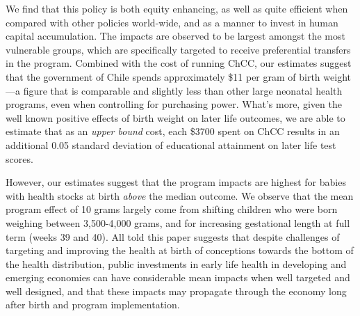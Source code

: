 \documentclass[12pt]{article}
\begin{document}
\begin{spacing}{1.4}
We find that this policy is both equity enhancing, as well as quite
efficient when compared with other policies world-wide, and as a manner
to invest in human capital accumulation.  The impacts are observed to
be largest amongst the most vulnerable groups, which are specifically
targeted to receive preferential transfers in the program. Combined with
the cost of running ChCC, our estimates suggest that the government of
Chile spends approximately \$11 per gram of birth weight---a figure that
is comparable and slightly less than other large neonatal health programs,
even when controlling for purchasing power.  What's more, given the well
known positive effects of birth weight on later life outcomes, we are able
to estimate that as an \emph{upper bound} cost, each \$3700 spent on ChCC
results in an additional 0.05 standard deviation of educational attainment
on later life test scores.

However, our estimates suggest that the program impacts are highest for
babies with health stocks at birth \emph{above} the median outcome.  We
observe that the mean program effect of 10 grams largely come from
shifting children who were born weighing between 3,500-4,000 grams, and
for increasing gestational length at full term (weeks 39 and 40). 
All told this paper suggests that despite challenges of targeting and
improving the health at birth of conceptions towards the bottom of the
health distribution, public investments in early life health in developing
and emerging economies can have considerable mean impacts when well targeted
and well designed, and that these impacts may propagate through the economy
long after birth and program implementation.  %



%




\end{spacing}
\end{document}
